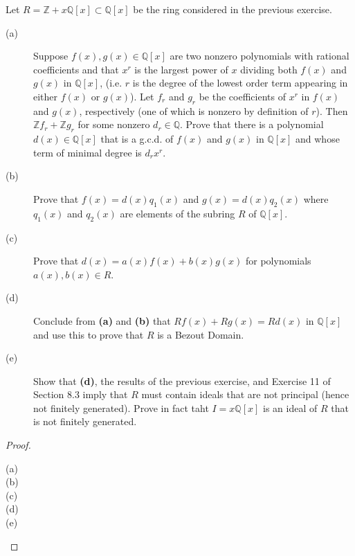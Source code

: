 \documentclass[12pt,leqno]{book}
\numberwithin{equation}{section}
\newcommand{\question}[2] {\vspace{.25in}\noindent\fbox{#1} #2 \vspace{.10in}}
\theoremstyle{definition}
\begin{document}
\question{5}{Let $R=\mathbb{Z}+x\mathbb{Q}[x]\subset\mathbb{Q}[x]$ be the ring considered in the previous exercise.}
\begin{description}
 \item [(a)] Suppose $f(x),g(x)\in\mathbb{Q}[x]$ are two nonzero polynomials with rational coefficients and that $x^r$ is the largest power of $x$ dividing both $f(x)$ and $g(x)$ in $\mathbb{Q}[x]$, (i.e. $r$ is the degree of the lowest order term appearing in either $f(x)$ or $g(x)$). Let $f_r$ and $g_r$ be the coefficients of $x^r$ in $f(x)$ and $g(x)$, respectively (one of which is nonzero by definition of $r$). Then $\mathbb{Z}f_r+\mathbb{Z}g_r$ for some nonzero $d_r\in\mathbb{Q}$. Prove that there is a polynomial $d(x)\in\mathbb{Q}[x]$ that is a g.c.d. of $f(x)$ and $g(x)$ in $\mathbb{Q}[x]$ and whose term of minimal degree is $d_rx^r$. 
 \item [(b)] Prove that $f(x)=d(x)q_1(x)$ and $g(x)=d(x)q_2(x)$ where $q_1(x)$ and $q_2(x)$ are elements of the subring $R$ of $\mathbb{Q}[x]$.
 \item [(c)] Prove that $d(x)=a(x)f(x)+b(x)g(x)$ for polynomials $a(x),b(x)\in R$. 
 \item [(d)] Conclude from \textbf{(a)} and \textbf{(b)} that $Rf(x)+Rg(x)=Rd(x)$ in $\mathbb{Q}[x]$ and use this to prove that $R$ is a Bezout Domain.
 \item [(e)] Show that \textbf{(d)}, the results of the previous exercise, and Exercise 11 of Section 8.3 imply that $R$ must contain ideals that are not principal (hence not finitely generated). Prove in fact taht $I=x\mathbb{Q}[x]$ is an ideal of $R$ that is not finitely generated.
\end{description}

\begin{proof}
 \begin{description}
  \item [(a)] 
  \item [(b)]
  \item [(c)]
  \item [(d)]
  \item [(e)]
 \end{description}
\end{proof}
\end{document}
